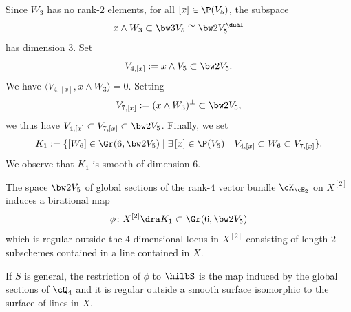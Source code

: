 Since $W_3$ has no rank-$2$ elements, for all
$[x]\in \P(V_5)$, the subspace
\[
x\wedge W_3\subset \bw3V_5\cong \bw2 V_5^\dual
\]
has dimension $3$. Set
\[
V_{4,[x]}:=x\wedge V_5\subset \bw2 V_5.
\]
We have
$\langle V_{4,[x]},x\wedge W_3\rangle=0$.
Setting
\[
V_{7,[x]} :=(x\wedge W_3)^\perp\subset \bw2 V_5,
\]
we thus have
$V_{4,[x]}\subset V_{7,[x]}\subset \bw2 V_5$.
Finally, we set
\begin{equation}\label{defk1}
K_1:=\{ [W_6]\in \Gr(6,\bw2 V_5)\mid \exists\, [x]\in \P(V_5)\quad V_{4,[x]}\subset W_6\subset V_{7,[x]}\}.
\end{equation}
We observe that $K_1$ is smooth of dimension $6$.

\skpt
\begin{prop} \label{propbirat}
\begin{enumeratea}
\item\label{propbirata}
The space $\bw2 V_5$ of global sections of the rank-$4$ vector bundle $ \cK_{\cE_2} $ on $ X^{[2]}$ induces a
birational map
\[
\phi\colon X^{[2]}\dra K_1\subset \Gr(6,\bw2 V_5)
\]
which is regular outside the $4$-dimensional locus in $ X^{[2]}$ consisting of length-$2$ subschemes
contained in a line contained in $X$.

\item\label{propbiratb}
If $S$ is general, the restriction of $\phi$ to $\hilbS$ is the map induced by the global sections of $\cQ_4$ and it is regular outside a smooth surface isomorphic to the surface of lines in $X$.
\end{enumeratea}
\end{prop}

